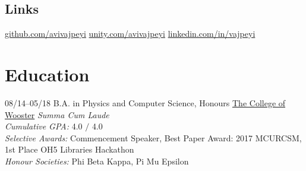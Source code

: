 \documentclass[]{friggeri-cv}
\def\faLinkedIn{\FA\symbol{"F08C}} %
\begin{document}
\begin{aside}
  \section{Links}
    \href{https://github.com/avivajpeyi}{github.com/avivajpeyi}
    \href{https://connect.unity.com/u/5839ddf732b306002a9e7422}{unity.com/avivajpeyi}
    \href{https://www.linkedin.com/in/vajpeyi}{ linkedin.com/in/vajpeyi}
\end{aside}

\section{Education}
\begin{entrylist}
  \entry
    {08/14–05/18}
    {B.A. in Physics and Computer Science, Honours}
    {\href{https://www.wooster.edu/}{The College of Wooster}}
    {\emph{Summa Cum Laude}\\
    \emph{Cumulative GPA:} 4.0 $/$ 4.0\\
    \emph{Selective Awards:} Commencement Speaker, Best Paper Award: 2017 MCURCSM, 1st Place OH5 Libraries Hackathon\\
    \emph{Honour Societies:} Phi Beta Kappa, Pi Mu Epsilon}
\end{entrylist}
%
\end{document}
